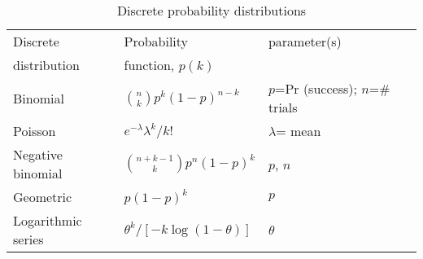 \begin{table}[htbp]%
\caption{Discrete probability distributions\label{tab:distns}}%
\medskip
\small
\centering
\begin{tabular}{lll}\hline
Discrete          & Probability       & parameter(s)    \\ 
distribution      & function, $p(k)$  
\\ \hline
%
Binomial           & $\binom nk p^k(1-p)^{n-k}$       & \brk{$p$=Pr (success);\\ $n$=\# trials} \\[1ex] 
Poisson            & $e^{-\lambda }\lambda ^k/k!$     & $\lambda$= mean  \\[1ex] 
Negative binomial  & $\binom{n+k-1}kp^n(1-p)^k$       &  $p$, $n$  \\[1ex] 
Geometric          & $p(1-p)^k$                       &  $p$  \\[1ex]
Logarithmic series & $\theta ^k/[-k\log (1-\theta )]$ &  $\theta$ \\[1ex] \hline
\end{tabular}
\end{table}%

